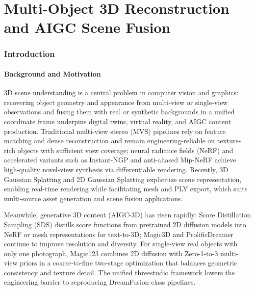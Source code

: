 \documentclass[10pt,twocolumn,letterpaper]{article}
\begin{document}
\part{Multi-Object 3D Reconstruction and AIGC Scene Fusion}

\section{Introduction}
\label{sec:t1-intro}

\subsection{Background and Motivation}

3D scene understanding is a central problem in computer vision and graphics: recovering object geometry and appearance from multi-view or single-view observations and fusing them with real or synthetic backgrounds in a unified coordinate frame underpins digital twins, virtual reality, and AIGC content production. Traditional multi-view stereo (MVS) pipelines rely on feature matching and dense reconstruction\cite{schoenberger2016sfm,schoenberger2016mvs} and remain engineering-reliable on texture-rich objects with sufficient view coverage; neural radiance fields (NeRF)\cite{mildenhall2020nerf} and accelerated variants such as Instant-NGP\cite{muller2022instantngp} and anti-aliased Mip-NeRF\cite{barron2021mipnerf,barron2022mipnerf360} achieve high-quality novel-view synthesis via differentiable rendering. Recently, 3D Gaussian Splatting\cite{kerbl2023gaussians} and 2D Gaussian Splatting\cite{huang20242dgs} explicitize scene representation, enabling real-time rendering while facilitating mesh and PLY export, which suits multi-source asset generation and scene fusion applications.

Meanwhile, generative 3D content (AIGC-3D) has risen rapidly: Score Distillation Sampling (SDS)\cite{poole2022dreamfusion} distills score functions from pretrained 2D diffusion models\cite{rombach2022ldm} into NeRF or mesh representations for text-to-3D; Magic3D\cite{lin2023magic3d} and ProlificDreamer\cite{wang2023prolificdreamer} continue to improve resolution and diversity. For single-view real objects with only one photograph, Magic123\cite{qian2023magic123} combines 2D diffusion with Zero-1-to-3\cite{liu2023zero123} multi-view priors in a coarse-to-fine two-stage optimization that balances geometric consistency and texture detail. The unified threestudio\cite{threestudio2023} framework lowers the engineering barrier to reproducing DreamFusion-class pipelines.
\end{document}
